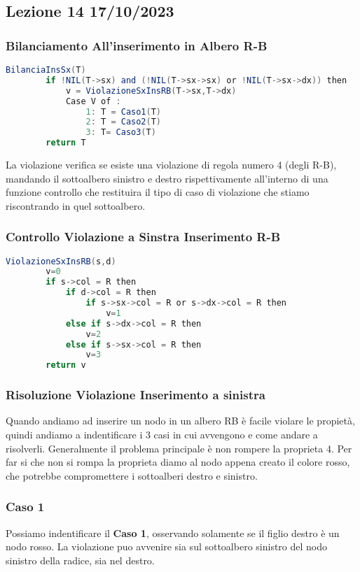\subsection{Lezione 14 17/10/2023}

\subsubsection{Bilanciamento All'inserimento in Albero R-B}

\begin{lstlisting}[language=Java]
	BilanciaInsSx(T)
		if !NIL(T->sx) and (!NIL(T->sx->sx) or !NIL(T->sx->dx)) then
			v = ViolazioneSxInsRB(T->sx,T->dx)
			Case V of :
				1: T = Caso1(T)
				2: T = Caso2(T)
				3: T= Caso3(T)
		return T
\end{lstlisting}

La violazione verifica se esiste una violazione di regola numero 4 (degli R-B), mandando il sottoalbero sinistro e destro rispettivamente all'interno di una funzione controllo che restituira il tipo di caso di violazione che stiamo riscontrando in quel sottoalbero.

\subsubsection{Controllo Violazione a Sinstra Inserimento R-B}

\begin{lstlisting}[language=Java]
	ViolazioneSxInsRB(s,d)
		v=0
		if s->col = R then
			if d->col = R then
				if s->sx->col = R or s->dx->col = R then
					v=1
			else if s->dx->col = R then
				v=2
			else if s->sx->col = R then
				v=3
		return v
\end{lstlisting}


\subsubsection{Risoluzione Violazione Inserimento a sinistra}
Quando andiamo ad inserire un nodo in un albero RB è facile violare le propietà, quindi andiamo a indentificare i 3 casi in cui avvengono e come andare a risolverli. Generalmente il problema principale è non rompere la proprieta 4. Per far si che non si rompa la proprieta diamo al nodo appena creato il colore rosso, che potrebbe compromettere i sottoalberi destro e sinistro.
\subsubsection{Caso 1}
Possiamo indentificare il \textbf{Caso 1}, osservando solamente se il figlio destro è un nodo rosso. La violazione puo avvenire sia sul sottoalbero sinistro del nodo sinistro della radice, sia nel destro.

